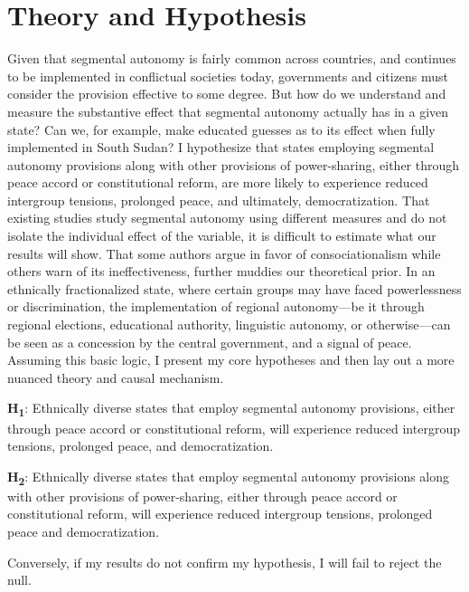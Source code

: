 \documentclass[12pt]{article}
\begin{document}
\section{Theory and Hypothesis}
Given that segmental autonomy is fairly common across countries, and continues to be implemented in conflictual societies today, governments and citizens must consider the provision effective to some degree. But how do we understand and measure the substantive effect that segmental autonomy actually has in a given state? Can we, for example, make educated guesses as to its effect when fully implemented in South Sudan? I hypothesize that states employing segmental autonomy provisions along with other provisions of power-sharing, either through peace accord or constitutional reform, are more likely to experience reduced intergroup tensions, prolonged peace, and ultimately, democratization. That existing studies study segmental autonomy using different measures and do not isolate the individual effect of the variable, it is difficult to estimate what our results will show. That some authors argue in favor of consociationalism while others warn of its ineffectiveness, further muddies our theoretical prior. In an ethnically fractionalized state, where certain groups may have faced powerlessness or discrimination, the implementation of regional autonomy---be it through regional elections, educational authority, linguistic autonomy, or otherwise---can be seen as a concession by the central government, and a signal of peace. Assuming this basic logic, I present my core hypotheses and then lay out a more nuanced theory and causal mechanism. 

\singlespacing

\textbf{H\textsubscript{1}}: Ethnically diverse states that employ segmental autonomy provisions, either through peace accord or constitutional reform, will experience reduced intergroup tensions, prolonged peace, and democratization.

\bigskip

\textbf{H\textsubscript{2}}: Ethnically diverse states that employ segmental autonomy provisions along with other provisions of power-sharing, either through peace accord or constitutional reform, will experience reduced intergroup tensions, prolonged peace and democratization. 

\doublespacing

Conversely, if my results do not confirm my hypothesis, I will fail to reject the null. 

\singlespacing
\end{document}
